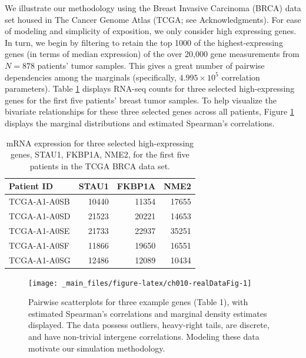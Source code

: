 \documentclass[
]{jss}
\begin{document}
We illustrate our methodology using the Breast Invasive Carcinoma (BRCA) data set housed in The Cancer Genome Atlas (TCGA; see Acknowledgments). For ease of modeling and simplicity of exposition, we only consider high expressing genes. In turn, we begin by filtering to retain the top 1000 of the highest-expressing genes (in terms of median expression) of the over 20,000 gene measurements from \(N=878\) patients' tumor samples. This gives a great number of pairwise dependencies among the marginals (specifically, \(\ensuremath{4.995\times 10^{5}}\) correlation parameters). Table \ref{tab:ch010-realDataTab} displays RNA-seq counts for three selected high-expressing genes for the first five patients' breast tumor samples. To help visualize the bivariate relationships for these three selected genes across all patients, Figure \ref{fig:ch010-realDataFig} displays the marginal distributions and estimated Spearman's correlations.

\begin{CodeChunk}
\begin{table}

\caption{\label{tab:ch010-realDataTab}mRNA expression for three selected high-expressing genes, STAU1, FKBP1A, NME2, for the first five patients in the TCGA BRCA data set.}
\centering
\begin{tabular}[t]{lrrr}
\toprule
Patient ID & STAU1 & FKBP1A & NME2\\
\midrule
TCGA-A1-A0SB & 10440 & 11354 & 17655\\
TCGA-A1-A0SD & 21523 & 20221 & 14653\\
TCGA-A1-A0SE & 21733 & 22937 & 35251\\
TCGA-A1-A0SF & 11866 & 19650 & 16551\\
TCGA-A1-A0SG & 12486 & 12089 & 10434\\
\bottomrule
\end{tabular}
\end{table}

\end{CodeChunk}

\begin{CodeChunk}
\begin{figure}

{\centering \texttt{[image: \_main\_files/figure-latex/ch010-realDataFig-1]} 

}

\caption[Pairwise scatterplots for three example genes (Table 1), with estimated Spearman's correlations and marginal density estimates displayed]{Pairwise scatterplots for three example genes (Table 1), with estimated Spearman's correlations and marginal density estimates displayed. The data possess outliers, heavy-right tails, are discrete, and have non-trivial intergene correlations. Modeling these data motivate our simulation methodology.}\label{fig:ch010-realDataFig}
\end{figure}
\end{CodeChunk}
\end{document}
